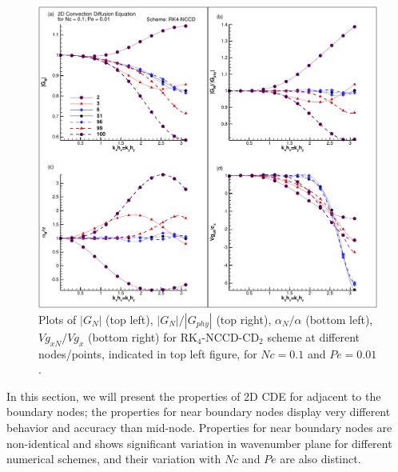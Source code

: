 \documentclass[showpacs,preprintnumbers,amsmath,amssymb]{revtex4-1} %
\begin{document}
\begin{figure}[h]
\begin{center}
\includegraphics[width=150mm]{prop_NCCD_nodes.pdf}
\end{center}
\raggedleft
\caption{Plots of $|G_N|$ (top left), $|G_N|/|G_{phy}|$ (top right), $\alpha_N/\alpha$ (bottom left), $Vg_{xN}/Vg_x$ (bottom right) for RK$_4$-NCCD-CD$_2$ scheme at different nodes/points, indicated in top left figure, for $Nc=0.1$ and $Pe=0.01$.}
\label{fig_NCCD_nodes}
\end{figure}

In this section, we will present the properties of 2D CDE for adjacent to the boundary nodes; the properties for near boundary nodes display very different behavior and accuracy than mid-node. Properties for near boundary nodes are non-identical and shows significant variation in wavenumber plane for different numerical schemes, and their variation with $Nc$ and $Pe$ are also distinct.
\end{document}
